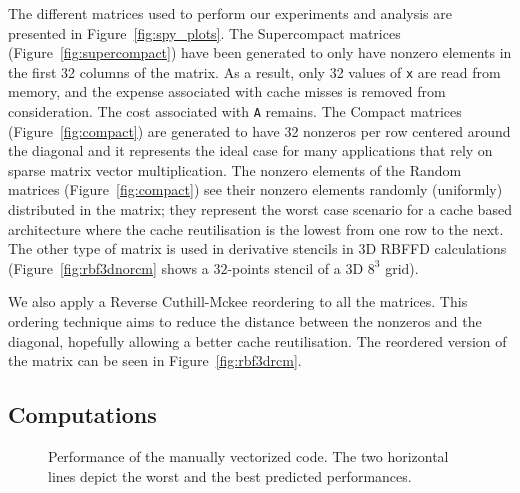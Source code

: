 \documentclass[10pt,conference,compsocconf]{IEEEtran}
\begin{document}
The different matrices used to perform our experiments and analysis
are presented in Figure~\ref{fig:spy_plots}. The
Supercompact matrices (Figure~\ref{fig:supercompact}) have been
generated to only have nonzero elements in the first 32 columns of
the matrix. As a result, only 32 values of {\tt x} are read
from memory, and the expense associated with cache misses is removed from consideration. The cost associated with 
{\tt A} remains. The Compact matrices
(Figure~\ref{fig:compact}) are generated to have 32 nonzeros per row
centered around the diagonal and it represents the ideal case for many
applications that rely on sparse matrix vector multiplication. The nonzero
elements of the Random
matrices (Figure~\ref{fig:compact}) see their nonzero elements
randomly (uniformly) distributed in the matrix; they represent the
worst case scenario for a cache based architecture where the cache
reutilisation is the lowest from one row to the next.
The other type of matrix is used in derivative stencils in 3D
RBFFD calculations (Figure~\ref{fig:rbf3dnorcm} shows a $32$-points
stencil of a 3D $8^3$ grid).

We also apply a Reverse Cuthill-Mckee reordering to
all the matrices.  This ordering technique aims to reduce the
distance between the nonzeros and the diagonal, hopefully allowing a
better cache reutilisation. The reordered version of the matrix can be
seen in Figure~\ref{fig:rbf3drcm}.

\vspace{-0.3em}
\subsection{Computations}

\begin{figure}[t]
  \centering
  
  \caption{Performance of the manually vectorized code. The two
    horizontal lines depict the worst and the best predicted performances.}
  \label{fig:expe_types}
\end{figure}
\end{document}
